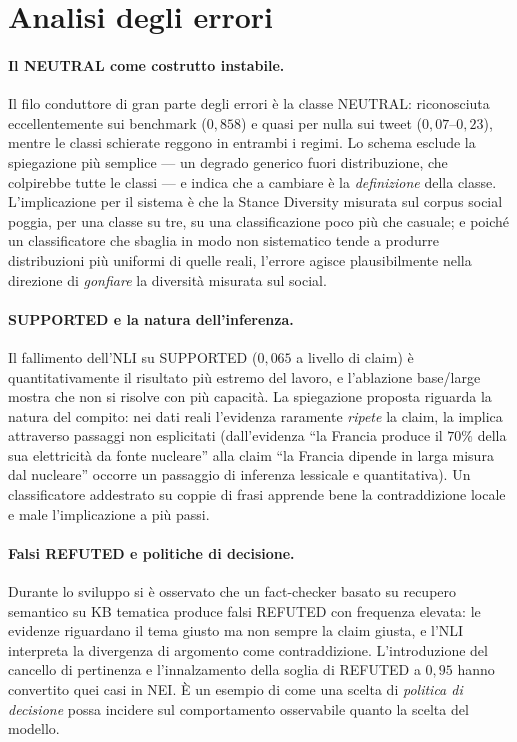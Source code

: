 \documentclass[11pt,a4paper]{report}
\begin{document}
\section{Analisi degli errori}
\paragraph{Il NEUTRAL come costrutto instabile.} Il filo conduttore di gran parte degli errori è la
classe NEUTRAL: riconosciuta eccellentemente sui benchmark ($0{,}858$) e quasi per nulla sui tweet
($0{,}07$--$0{,}23$), mentre le classi schierate reggono in entrambi i regimi. Lo schema esclude la
spiegazione più semplice --- un degrado generico fuori distribuzione, che colpirebbe tutte le classi
--- e indica che a cambiare è la \emph{definizione} della classe. L'implicazione per il sistema è
che la Stance Diversity misurata sul corpus social poggia, per una classe su tre, su una
classificazione poco più che casuale; e poiché un classificatore che sbaglia in modo non sistematico
tende a produrre distribuzioni più uniformi di quelle reali, l'errore agisce plausibilmente nella
direzione di \emph{gonfiare} la diversità misurata sul social.

\paragraph{SUPPORTED e la natura dell'inferenza.} Il fallimento dell'NLI su SUPPORTED ($0{,}065$ a
livello di claim) è quantitativamente il risultato più estremo del lavoro, e l'ablazione base/large
mostra che non si risolve con più capacità. La spiegazione proposta riguarda la natura del compito:
nei dati reali l'evidenza raramente \emph{ripete} la claim, la implica attraverso passaggi non
esplicitati (dall'evidenza ``la Francia produce il $70\%$ della sua elettricità da fonte nucleare''
alla claim ``la Francia dipende in larga misura dal nucleare'' occorre un passaggio di inferenza
lessicale e quantitativa). Un classificatore addestrato su coppie di frasi apprende bene la
contraddizione locale e male l'implicazione a più passi.

\paragraph{Falsi REFUTED e politiche di decisione.} Durante lo sviluppo si è osservato che un
fact-checker basato su recupero semantico su KB tematica produce falsi REFUTED con frequenza
elevata: le evidenze riguardano il tema giusto ma non sempre la claim giusta, e l'NLI interpreta la
divergenza di argomento come contraddizione. L'introduzione del cancello di pertinenza e
l'innalzamento della soglia di REFUTED a $0{,}95$ hanno convertito quei casi in NEI. È un esempio di
come una scelta di \emph{politica di decisione} possa incidere sul comportamento osservabile quanto
la scelta del modello.
\end{document}
